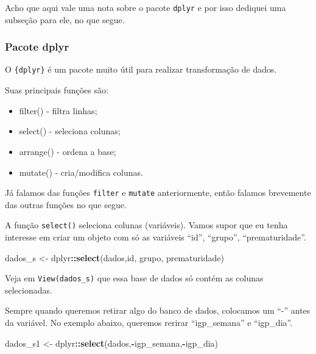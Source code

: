 \documentclass[
]{book}
\newenvironment{Shaded}{\begin{snugshade}}{\end{snugshade}}
\newcommand{\KeywordTok}[1]{\textcolor[rgb]{0.13,0.29,0.53}{\textbf{#1}}}
\newcommand{\NormalTok}[1]{#1}
\newcommand{\OperatorTok}[1]{\textcolor[rgb]{0.81,0.36,0.00}{\textbf{#1}}}
\newcommand{\StringTok}[1]{\textcolor[rgb]{0.31,0.60,0.02}{#1}}
\begin{document}
Acho que aqui vale uma nota sobre o pacote \texttt{dplyr} e por isso dediquei uma subseção para ele, no que segue.

\hypertarget{pacote-dplyr}{%
\subsubsection{Pacote dplyr}\label{pacote-dplyr}}

O \texttt{\{dplyr\}} é um pacote muito útil para realizar transformação de dados.

Suas principais funções são:

\begin{itemize}
\item
  filter() - filtra linhas;
\item
  select() - seleciona colunas;
\item
  arrange() - ordena a base;
\item
  mutate() - cria/modifica colunas.
\end{itemize}

Já falamos das funções \texttt{filter} e \texttt{mutate} anteriormente, então falamos brevemente das outras funções no que segue.

A função \texttt{select()} seleciona colunas (variáveis). Vamos supor que eu tenha interesse em criar um objeto com só as variáveis ``id'', ``grupo'', ``prematuridade''.

\begin{Shaded}
\begin{Highlighting}[]
\NormalTok{dados_s <-}\StringTok{ }\NormalTok{dplyr}\OperatorTok{::}\KeywordTok{select}\NormalTok{(dados,id, grupo, prematuridade)}
\end{Highlighting}
\end{Shaded}

Veja em \texttt{View(dados\_s)} que essa base de dados só contém as colunas selecionadas.

Sempre quando queremos retirar algo do banco de dados, colocamos um ``-'' antes da variável. No exemplo abaixo, queremos rerirar ``igp\_semana'' e ``igp\_dia''.

\begin{Shaded}
\begin{Highlighting}[]
\NormalTok{dados_s1 <-}\StringTok{ }\NormalTok{dplyr}\OperatorTok{::}\KeywordTok{select}\NormalTok{(dados,}\OperatorTok{-}\NormalTok{igp_semana,}\OperatorTok{-}\NormalTok{igp_dia)}
\end{Highlighting}
\end{Shaded}
\end{document}
